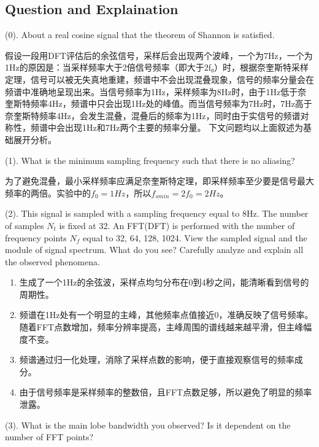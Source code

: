 \documentclass{article}
\begin{document}
\subsection{Question and Explaination}
\vspace{1em}

(0). About a real cosine signal that the theorem of Shannon is satisfied.

假设一段用DFT评估后的余弦信号，采样后会出现两个波峰，一个为7Hz，一个为1Hz的原因是：当采样频率大于2倍信号频率（即大于2f₀）时，根据奈奎斯特采样定理，信号可以被无失真地重建，频谱中不会出现混叠现象，信号的频率分量会在频谱中准确地呈现出来。当信号频率为1Hz，采样频率为8Hz时，由于1Hz低于奈奎斯特频率4Hz，频谱中只会出现1Hz处的峰值。而当信号频率为7Hz时，7Hz高于奈奎斯特频率4Hz，会发生混叠，混叠后的频率为1Hz，同时由于实信号的频谱对称性，频谱中会出现1Hz和7Hz两个主要的频率分量。
下文问题均以上面叙述为基础展开分析。
\vspace{3em}


(1). What is the minimum sampling frequency such that there is no aliasing?

为了避免混叠，最小采样频率应满足奈奎斯特定理，即采样频率至少要是信号最大频率的两倍。实验中的\(f_0=1Hz\)，所以\(f_{smin}=2f_0=2Hz\)。
\vspace{3em}

(2). This signal is sampled with a sampling frequency equal to 8Hz. The number of samples \(N_t\) is fixed at 32. An FFT(DFT) is performed with the number of frequency points \(N_f\) equal to 32, 64, 128, 1024. View the sampled signal and the module of signal spectrum. What do you see? Carefully analyze and explain all the observed phenomena.
\begin{enumerate}
    \item 生成了一个1Hz的余弦波，采样点均匀分布在0到4秒之间，能清晰看到信号的周期性。
    \item 频谱在1Hz处有一个明显的主峰，其他频率点值接近0，准确反映了信号频率。
     随着FFT点数增加，频率分辨率提高，主峰周围的谱线越来越平滑，但主峰幅度不变。
    \item 频谱通过归一化处理，消除了采样点数的影响，便于直接观察信号的频率成分。
    \item 由于信号频率是采样频率的整数倍，且FFT点数足够，所以避免了明显的频率泄露。
\end{enumerate}

\vspace{3em}

(3). What is the main lobe bandwidth you observed? Is it dependent on the number of FFT points?\vspace{1em}
\end{document}
